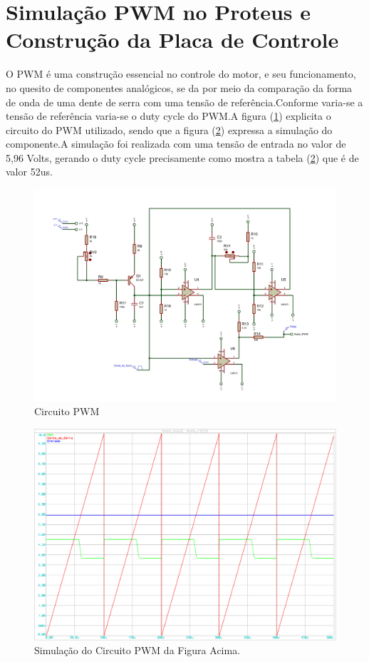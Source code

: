 \documentclass{Fabiano_file}
\begin{document}
{\section{Simulação PWM no Proteus e Construção da Placa de Controle}
O PWM é uma construção essencial no controle do motor, e  seu funcionamento, no quesito de componentes analógicos, se da por meio da comparação da forma de 
onda de uma dente de serra com uma tensão de referência.Conforme varia-se a tensão de referência  varia-se o duty cycle do PWM.A figura (\ref{PWM}) explicita
o circuito do PWM utilizado, sendo que a figura (\ref{Simulacao_PWM_Proteus1}) expressa a simulação do componente.A simulação foi realizada com uma tensão de 
entrada no valor de  5,96 Volts, gerando o duty cycle precisamente como mostra a tabela (\ref{Simulacao_PWM_Proteus1}) que é de valor 52us.

\begin{figure}[h!]
\centering
\includegraphics[width=.9\textwidth]{pwm.pdf}
\caption{Circuito PWM}
\label{PWM}
\end{figure}

\begin{figure}[h!]
\centering
\includegraphics[width=.5\textwidth]{simulacao_pwm_proteus.pdf}
\caption{Simulação do Circuito PWM da Figura Acima.}
\label{Simulacao_PWM_Proteus1}
\end{figure}

}
\end{document}
